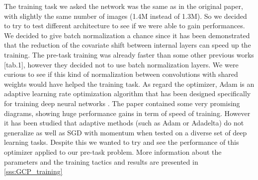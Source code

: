 The training task we asked the network was the same as in the original paper, with slightly the same number of images (1.4M instead of 1.3M). So we decided to try to test different architecture to see if we were able to gain performances.\newline
We decided to give batch normalization a chance since it has been demonstrated \cite{batch_norm_paper} that the reduction of the covariate shift between internal layers can speed up the training. The pre-task training was already faster than some other previous works \cite{Noroozi_2016}[tab.1], however they decided not to use batch normalization layers. We were curious to see if this kind of normalization between convolutions with shared weights would have helped the training task. \newline
As regard the optimizer, Adam is an adaptive learning rate optimization algorithm that has been designed specifically for training deep neural networks \cite{adam_trend}. The paper contained some very promising diagrams, showing huge performance gains in term of speed of training. However it has been studied that adaptive methods (such as Adam or Adadelta) do not generalize as well as SGD with momentum \cite{adam_generalization} when tested on a diverse set of deep learning tasks. Despite this we wanted to try and see the performance of this optimizer applied to our pre-task problem. More information about the parameters and the training tactics and results are presented in \ref{sss:GCP_training}
